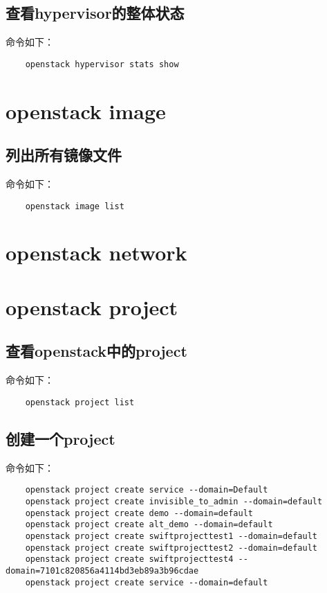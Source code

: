 \documentclass[a4paper,left=1.5cm,right=1.5cm,11pt]{article}
\begin{document}
\subsection{查看hypervisor的整体状态}
	命令如下：
	\begin{lstlisting}
	openstack hypervisor stats show
	\end{lstlisting}

\section{openstack image}
\subsection{列出所有镜像文件}
	命令如下：
	\begin{lstlisting}
	openstack image list
	\end{lstlisting}

\section{openstack network}

\section{openstack project}
\subsection{查看openstack中的project}
	命令如下：
	\begin{lstlisting}
	openstack project list
	\end{lstlisting}

\subsection{创建一个project}
	命令如下：
	\begin{lstlisting}
	openstack project create service --domain=Default
	openstack project create invisible_to_admin --domain=default
	openstack project create demo --domain=default
	openstack project create alt_demo --domain=default
	openstack project create swiftprojecttest1 --domain=default
	openstack project create swiftprojecttest2 --domain=default
	openstack project create swiftprojecttest4 --domain=7101c820856a4114bd3eb89a3b96cdae
	openstack project create service --domain=default
	\end{lstlisting}
\end{document}

